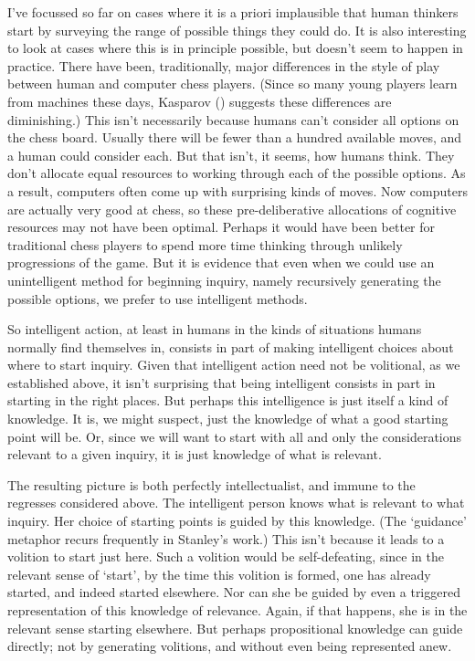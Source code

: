 \documentclass[
  11pt,
  letterpaper,
  DIV=11,
  numbers=noendperiod,
  oneside]{scrartcl}
\begin{document}
I've focussed so far on cases where it is a priori implausible that
human thinkers start by surveying the range of possible things they
could do. It is also interesting to look at cases where this is in
principle possible, but doesn't seem to happen in practice. There have
been, traditionally, major differences in the style of play between
human and computer chess players. (Since so many young players learn
from machines these days, Kasparov ()
suggests these differences are diminishing.) This isn't necessarily because humans can't consider all
options on the chess board. Usually there will be fewer than a hundred
available moves, and a human could consider each. But that isn't, it
seems, how humans think. They don't allocate equal resources to working
through each of the possible options. As a result, computers often come
up with surprising kinds of moves. Now computers are actually very good
at chess, so these pre-deliberative allocations of cognitive resources
may not have been optimal. Perhaps it would have been better for
traditional chess players to spend more time thinking through unlikely
progressions of the game. But it is evidence that even when we could use
an unintelligent method for beginning inquiry, namely recursively
generating the possible options, we prefer to use intelligent methods.

So intelligent action, at least in humans in the kinds of situations
humans normally find themselves in, consists in part of making
intelligent choices about where to start inquiry. Given that intelligent
action need not be volitional, as we established above, it isn't
surprising that being intelligent consists in part in starting in the
right places. But perhaps this intelligence is just itself a kind of
knowledge. It is, we might suspect, just the knowledge of what a good
starting point will be. Or, since we will want to start with all and
only the considerations relevant to a given inquiry, it is just
knowledge of what is relevant.

The resulting picture is both perfectly intellectualist, and immune to
the regresses considered above. The intelligent person knows what is
relevant to what inquiry. Her choice of starting points is guided by
this knowledge. (The `guidance' metaphor recurs frequently in Stanley's
work.) This isn't because it leads to a volition to start just here.
Such a volition would be self-defeating, since in the relevant sense of
`start', by the time this volition is formed, one has already started,
and indeed started elsewhere. Nor can she be guided by even a triggered
representation of this knowledge of relevance. Again, if that happens,
she is in the relevant sense starting elsewhere. But perhaps
propositional knowledge can guide directly; not by generating volitions,
and without even being represented anew.
\end{document}
